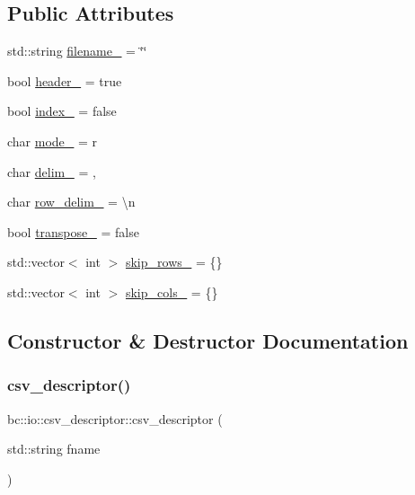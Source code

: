 \subsection*{Public Attributes}
\begin{DoxyCompactItemize}
\item 
std\+::string \hyperlink{structbc_1_1io_1_1csv__descriptor_a7a37ddce4708bb3a42647606a1e2942f}{filename\+\_\+} = \char`\"{}\char`\"{}
\item 
bool \hyperlink{structbc_1_1io_1_1csv__descriptor_a827d9bab2e7e9362e8cddf455e79a90d}{header\+\_\+} = true
\item 
bool \hyperlink{structbc_1_1io_1_1csv__descriptor_ac96b71536e00a8858526c06dc4a8df3b}{index\+\_\+} = false
\item 
char \hyperlink{structbc_1_1io_1_1csv__descriptor_afba2c0ad4cfa55f987072118d96dc866}{mode\+\_\+} = \textquotesingle{}r\textquotesingle{}
\item 
char \hyperlink{structbc_1_1io_1_1csv__descriptor_a869a10ddb0ace41f1e9c3fe14dc7af3a}{delim\+\_\+} = \textquotesingle{},\textquotesingle{}
\item 
char \hyperlink{structbc_1_1io_1_1csv__descriptor_a0f5e5e96432c137295e0ccc8796727a4}{row\+\_\+delim\+\_\+} = \textquotesingle{}\textbackslash{}n\textquotesingle{}
\item 
bool \hyperlink{structbc_1_1io_1_1csv__descriptor_a5c41734db6ce83b824c67370f08070bb}{transpose\+\_\+} = false
\item 
std\+::vector$<$ int $>$ \hyperlink{structbc_1_1io_1_1csv__descriptor_ac5cac888e83985fa43b67ae927ce9fc5}{skip\+\_\+rows\+\_\+} = \{\}
\item 
std\+::vector$<$ int $>$ \hyperlink{structbc_1_1io_1_1csv__descriptor_afd7cf1029e002d3f0cad76366c576737}{skip\+\_\+cols\+\_\+} = \{\}
\end{DoxyCompactItemize}


\subsection{Constructor \& Destructor Documentation}
\mbox{\label{structbc_1_1io_1_1csv__descriptor_a4236072c562553bc0ea3a929794fe76e}} 
\subsubsection{\texorpdfstring{csv\+\_\+descriptor()}{csv\_descriptor()}}
{\footnotesize\ttfamily bc\+::io\+::csv\+\_\+descriptor\+::csv\+\_\+descriptor (\begin{DoxyParamCaption}\item[{std\+::string}]{fname }\end{DoxyParamCaption})\hspace{0.3cm}{\ttfamily [inline]}}



